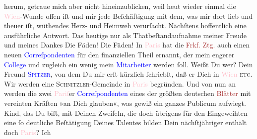                herum, getraue mich aber nicht hineinzublicken, weil heut wieder einmal die \textcolor{pink}{Wien}{}\ledrightnote{\textcolor{pink}{Wien}}-Wunde offen iſt und mir jede Beſchäftigung mit dem, was mir dort lieb
               und theuer iſt, wüthendes Herz- und Heimweh verurſacht. Nächſtens hoffentlich eine
               ausführliche Antwort. Das heutige nur als Thatbeſtandaufnahme meiner Freude und
               meines Dankes{\dotsfour}\pend
           \pstart
           Die Fäden! Die Fäden! In \textcolor{pink}{Paris}{}\ledrightnote{\textcolor{pink}{Paris}} hat die \textcolor{brown}{Frkf. Ztg.}{}\ledrightnote{\textcolor{brown}{Frankfurter Zeitung}} auch{\pb}
               einen neuen \textcolor{blue}{Correſpondenten}{}
               für den finanziellen Theil ernannt, der mein engerer \textcolor{blue}{College}{}\strikeout{\textcolor{gray}{w}} und zugleich ein wenig mein \textcolor{blue}{Mitarbeiter}{} werden ſoll. Weißt Du wer? Dein Freund \textsc{\textcolor{blue}{Spitzer}{}\ledrightnote{\textcolor{blue}{Leopold Spitzer}}}, von dem Du mir erſt kürzlich ſchriebſt, daß er Dich in \textcolor{pink}{Wien}{}\ledrightnote{\textcolor{pink}{Wien}}{ }\label{K_L02671-1v}\label{K_L02671-1h}{ }\textsc{etc}. Wir werden eine \textsc{Schnitzler}-Gemeinde in \strikeout{\textcolor{gray}{Wi}{ }}\textcolor{pink}{Paris}{}\ledrightnote{\textcolor{pink}{Paris}} begründen. Und von nun an werden die zwei
                  \textcolor{pink}{Pariſ}{}\ledrightnote{\textcolor{pink}{Paris}}er \textcolor{blue}{Correſpondenten}{} eines der größten deutschen \textcolor{brown}{Blätter}{} mit vereinten Kräften »an Dich glauben«, was gewiß ein ganzes Publicum
               aufwiegt. Kind, das Du biſt, mit Deinen Zweifeln, die doch übrigens für den
               Eingeweihten eine ſo deutliche Beſtätigung Deines Talentes bilden{\dotsfour}\pend
           \pstart
           {\pb}Dein nächſtjähriger \label{K_L02671-2v}\label{K_L02671-2h} enthält doch \textcolor{pink}{Paris}{}\ledrightnote{\textcolor{pink}{Paris}}? Ich
